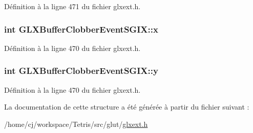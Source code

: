 Définition à la ligne 471 du fichier glxext.\-h.

\hypertarget{struct_g_l_x_buffer_clobber_event_s_g_i_x_a5118d48c3c8d5253d39922b5014b52ff}{
\subsubsection[{x}]{\setlength{\rightskip}{0pt plus 5cm}int G\-L\-X\-Buffer\-Clobber\-Event\-S\-G\-I\-X\-::x}}\label{struct_g_l_x_buffer_clobber_event_s_g_i_x_a5118d48c3c8d5253d39922b5014b52ff}


Définition à la ligne 470 du fichier glxext.\-h.

\hypertarget{struct_g_l_x_buffer_clobber_event_s_g_i_x_aef21efa11558a5b67861f96471c56003}{
\subsubsection[{y}]{\setlength{\rightskip}{0pt plus 5cm}int G\-L\-X\-Buffer\-Clobber\-Event\-S\-G\-I\-X\-::y}}\label{struct_g_l_x_buffer_clobber_event_s_g_i_x_aef21efa11558a5b67861f96471c56003}


Définition à la ligne 470 du fichier glxext.\-h.



La documentation de cette structure a été générée à partir du fichier suivant \-:\begin{DoxyCompactItemize}
\item 
/home/cj/workspace/\-Tetris/src/glut/\hyperlink{glxext_8h}{glxext.\-h}\end{DoxyCompactItemize}
